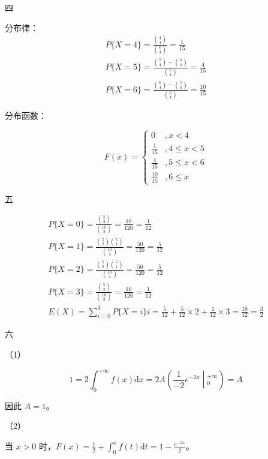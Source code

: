 \documentclass[UTF-8]{ctexart}
\begin{document}
四



分布律：
\begin{gather*}
P\{X=4\} =\frac{\binom{4}{4}}{\binom{6}{4}} =\frac{1}{15}\\
P\{X=5\} =\frac{\binom{5}{4} -\binom{4}{4}}{\binom{6}{4}} =\frac{4}{15}\\
P\{X=6\} =\frac{\binom{6}{4} -\binom{5}{4}}{\binom{6}{4}} =\frac{10}{15}
\end{gather*}

分布函数：


\begin{equation*}
F( x) =\begin{cases}
0 & ,x< 4\\
\frac{1}{15} & ,4\leqslant x< 5\\
\frac{4}{15} & ,5\leqslant x< 6\\
\frac{10}{15} & ,6\leqslant x
\end{cases}
\end{equation*}


五




\begin{gather*}
P\{X=0\} =\frac{\binom{5}{3}}{\binom{10}{3}} =\frac{10}{120} =\frac{1}{12}\\
P\{X=1\} =\frac{\binom{5}{2}\binom{5}{1}}{\binom{10}{3}} =\frac{50}{120} =\frac{5}{12}\\
P\{X=2\} =\frac{\binom{5}{2}\binom{5}{1}}{\binom{10}{3}} =\frac{50}{120} =\frac{5}{12}\\
P\{X=3\} =\frac{\binom{5}{3}}{\binom{10}{3}} =\frac{10}{120} =\frac{1}{12}\\
E( X) =\sum _{i=0}^{3} P\{X=i\} i=\frac{5}{12} +\frac{5}{12} \times 2+\frac{1}{12} \times 3=\frac{18}{12} =\frac{3}{2}
\end{gather*}


六



（1）


\begin{equation*}
1=2\int _{0}^{+\infty } f( x)\mathrm{d} x=2A\left(\frac{1}{-2} e^{-2x}\middle| _{0}^{+\infty }\right) =A
\end{equation*}

因此 $\displaystyle A=1$。



（2）

当 $\displaystyle x >0$ 时，$\displaystyle F( x) =\frac{1}{2} +\int _{0}^{x} f( t)\mathrm{d} t=1-\frac{e^{-2x}}{2}$。
\end{document}
